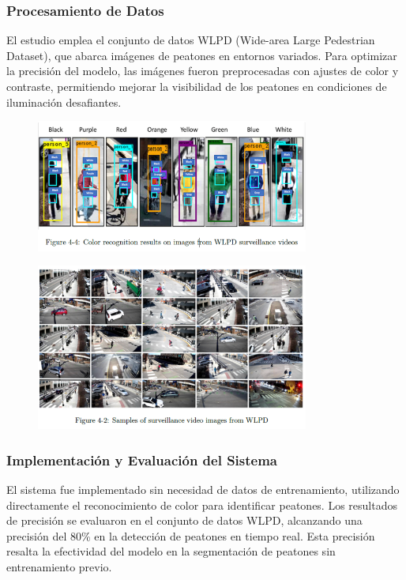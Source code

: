 \subsubsection{Procesamiento de Datos}
El estudio emplea el conjunto de datos WLPD (Wide-area Large Pedestrian Dataset), que abarca imágenes de peatones en entornos variados. Para optimizar la precisión del modelo, las imágenes fueron preprocesadas con ajustes de color y contraste, permitiendo mejorar la visibilidad de los peatones en condiciones de iluminación desafiantes.

\begin{figure}[h] %
    \centering
    \includegraphics[width=0.8\textwidth]{4/pro6.png} %
    \label{fig:ejemplo} %
\end{figure}

\begin{figure}[h] %
    \centering
    \includegraphics[width=0.8\textwidth]{4/pro6.1.png} %
    \label{fig:ejemplo} %
\end{figure}


\subsubsection{Implementación y Evaluación del Sistema}
El sistema fue implementado sin necesidad de datos de entrenamiento, utilizando directamente el reconocimiento de color para identificar peatones. Los resultados de precisión se evaluaron en el conjunto de datos WLPD, alcanzando una precisión del 80\% en la detección de peatones en tiempo real. Esta precisión resalta la efectividad del modelo en la segmentación de peatones sin entrenamiento previo.


